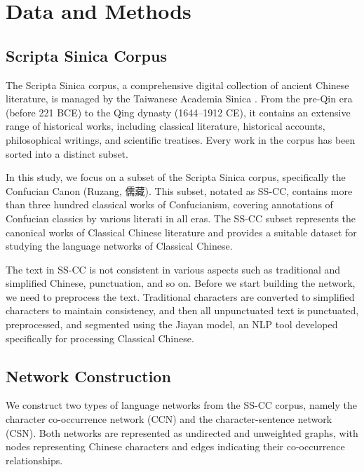 \documentclass[11pt]{article}
\begin{document}
\section{Data and Methods}

\subsection{Scripta Sinica Corpus}
The Scripta Sinica corpus, a comprehensive digital collection of ancient Chinese literature, is managed by the Taiwanese Academia Sinica \cite{ScriptaSinica}. From the pre-Qin era (before 221 BCE) to the Qing dynasty (1644–1912 CE), it contains an extensive range of historical works, including classical literature, historical accounts, philosophical writings, and scientific treatises. Every work in the corpus has been sorted into a distinct subset.

In this study, we focus on a subset of the Scripta Sinica corpus,  specifically the Confucian Canon (Ruzang, 儒藏). This subset, notated as SS-CC, contains more than three hundred classical works of Confucianism, covering annotations of Confucian classics by various literati in all eras. The SS-CC subset represents the canonical works of Classical Chinese literature and provides a suitable dataset for studying the language networks of Classical Chinese.

The text in SS-CC is not consistent in various aspects such as traditional and simplified Chinese, punctuation, and so on. Before we start building the network, we need to preprocess the text. Traditional characters are converted to simplified characters to maintain consistency, and then all unpunctuated text is punctuated, preprocessed, and segmented using the Jiayan model, an NLP tool developed specifically for processing Classical Chinese.

\subsection{Network Construction}
We construct two types of language networks from the SS-CC corpus, namely the character co-occurrence network (CCN) and the character-sentence network (CSN). Both networks are represented as undirected and unweighted graphs, with nodes representing Chinese characters and edges indicating their co-occurrence relationships.
\end{document}
